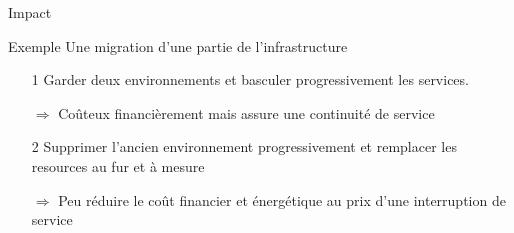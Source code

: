 \documentclass[aspectratio=169,10pt]{beamer}
\begin{document}
\begin{frame}{Impact}

\begin{alertblock}{Exemple}
Une migration d'une partie de l'infrastructure
  \begin{enumerate}
    \item[1] Garder deux environnements et basculer progressivement les services.
    \item[$\Rightarrow$] Coûteux financièrement mais assure une continuité de service
    \item[2] Supprimer l'ancien environnement progressivement et remplacer les resources au fur et à mesure
    \item[$\Rightarrow$] Peu réduire le coût financier et énergétique au prix d'une interruption de service
  \end{enumerate}
\end{alertblock}

\end{frame}

\end{document}
